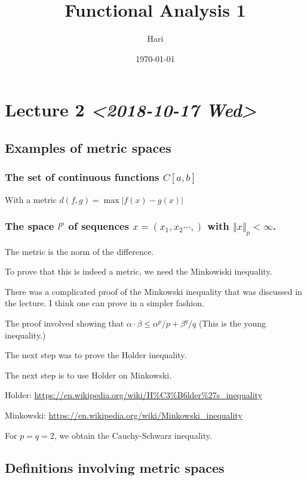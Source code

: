 \documentclass[11pt]{article}
\author{Hari}
\date{\today}
\title{Functional Analysis 1}
\begin{document}
\maketitle
\tableofcontents

\section{Lecture 2 \textit{<2018-10-17 Wed>}}
\label{sec:orgc48bdc1}

\subsection{Examples of metric spaces}
\label{sec:orgd2105f3}

\subsubsection{The set of continuous functions \(C[a, b]\)}
\label{sec:org50e02c5}
With a metric \(d(f, g) = \max\vert f(x) - g(x)\vert\)

\subsubsection{The space \(l^p\) of sequences \(x=(x_1, x_2 \cdots,)\) with \(\Vert x \Vert _p < \infty\).}
\label{sec:org97f1670}
The metric is the norm of the difference. 

To prove that this is indeed a metric, we need the Minkowiski inequality.

There was a complicated proof of the Minkowski inequality that was discussed
in the lecture. I think one can prove in a simpler fashion. 

The proof involved showing that \(\alpha \cdot \beta \le \alpha^{p}/p +
    \beta^{q}/q\) (This is the young inequality.)

The next step was to prove the Holder inequality. 

The next step is to use Holder on Minkowski. 

Holder: \url{https://en.wikipedia.org/wiki/H\%C3\%B6lder\%27s\_inequality}

Minkowski: \url{https://en.wikipedia.org/wiki/Minkowski\_inequality}

For \(p=q=2\), we obtain the Cauchy-Schwarz inequality. 

\subsection{Definitions involving metric spaces}
\label{sec:org3402326}
\end{document}
